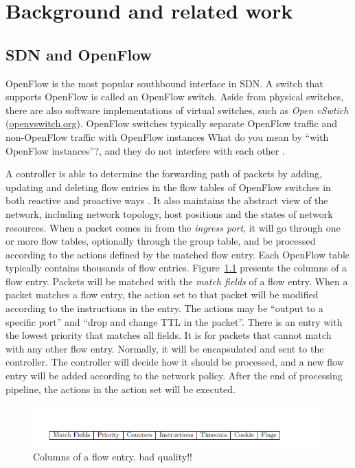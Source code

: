 \chapter{Background and related work}
\section{SDN and OpenFlow}

OpenFlow is the most popular southbound interface in SDN. A switch that supports OpenFlow is called an OpenFlow switch. Aside from physical switches, there are also software implementations of virtual switches, such as \textit{Open vSwtich} (\url{openvswitch.org}). OpenFlow switches typically separate OpenFlow traffic and non-OpenFlow traffic with OpenFlow instances {\color{red} What do you mean by ``with OpenFlow instances''?}, and they do not interfere with each other \cite{HP_SPEC}.

A controller is able to determine the forwarding path of packets by adding, updating and deleting flow entries in the flow tables of OpenFlow switches in both reactive and proactive ways \cite{OF_SPEC}. It also maintains the abstract view of the network, including network topology, host positions and the states of network resources. When a packet comes in from the \textit{ingress port}, it will go through one or more flow tables, optionally through the group table, and be processed according to the actions defined by the matched flow entry. Each OpenFlow table typically contains thousands of flow entries. Figure~\ref{FE_Col} presents the columns of a flow entry. Packets will be matched with the \textit{match fields} of a flow entry. When a packet matches a flow entry, the action set to that packet will be modified according to the instructions in the entry. The actions may be ``output to a specific port'' and ``drop and change TTL in the packet''. There is an entry with the lowest priority that matches all fields. It is for packets that cannot match with any other flow entry. Normally, it will be encapsulated and sent to the controller. The controller will decide how it should be processed, and a new flow entry will be added according to the network policy. After the end of processing pipeline, the actions in the action set will be executed.%

\begin{figure}[H]
\begin{center} 
\includegraphics[width=1\textwidth]{figures/columns_of_flow_entry.png}
\end{center}
\caption{Columns of a flow entry. {\color{red} bad quality!!}}
\label{FE_Col}
\end{figure}

